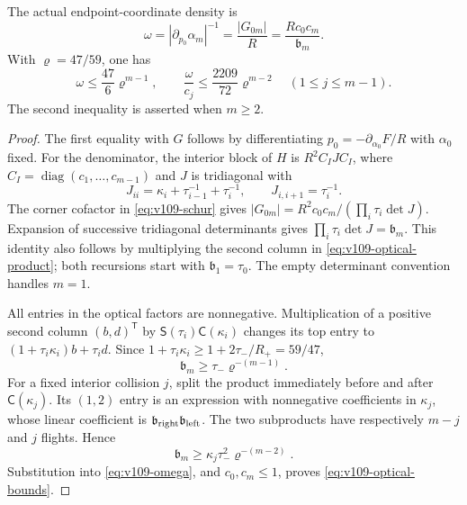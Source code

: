 \begin{lemma}
\label{lem:v109-denominator}
The actual endpoint-coordinate density is
\begin{equation}\label{eq:v109-omega}
 \omega=|\partial_{p_0}\alpha_m|^{-1}
        =\frac{|G_{0m}|}{R}=\frac{Rc_0c_m}{\mathfrak b_m}.
\end{equation}
With $\varrho=47/59$, one has
\begin{equation}\label{eq:v109-optical-bounds}
 \omega\leq\frac{47}{6}\varrho^{m-1},\qquad
 \frac{\omega}{c_j}\leq\frac{2209}{72}\varrho^{m-2}
          \quad(1\leq j\leq m-1).
\end{equation}
The second inequality is asserted when $m\geq2$.
\end{lemma}
\begin{proof}
The first equality with $G$ follows by differentiating
$p_0=-\partial_{\alpha_0}F/R$ with $\alpha_0$ fixed.
For the denominator, the interior block of $H$ is
$R^2 C_I J C_I$, where $C_I=\operatorname{diag}(c_1,\ldots,c_{m-1})$
and $J$ is tridiagonal with
\[
 J_{ii}=\kappa_i+\tau_{i-1}^{-1}+\tau_i^{-1},\qquad
 J_{i,i+1}=\tau_i^{-1}.
\]
The corner cofactor in \eqref{eq:v109-schur} gives
$|G_{0m}|=R^2c_0c_m/(\prod_i\tau_i\det J)$.
Expansion of successive tridiagonal determinants gives
$\prod_i\tau_i\det J=\mathfrak b_m$. This identity also follows
by multiplying the second column in \eqref{eq:v109-optical-product};
both recursions start with $\mathfrak b_1=\tau_0$.
The empty determinant convention handles $m=1$.

All entries in the optical factors are nonnegative. Multiplication
of a positive second column $(b,d)^{\mathsf T}$ by
$\mathsf S(\tau_i)\mathsf C(\kappa_i)$ changes its top entry to
$(1+\tau_i\kappa_i)b+\tau_i d$.
Since $1+\tau_i\kappa_i\geq1+2\tau_-/R_+=59/47$,
\begin{equation}\label{eq:v109-denominator-lower}
 \mathfrak b_m\geq\tau_-\varrho^{-(m-1)}.
\end{equation}
For a fixed interior collision $j$, split the product immediately
before and after $\mathsf C(\kappa_j)$. Its $(1,2)$ entry is an
expression with nonnegative coefficients in $\kappa_j$, whose linear
coefficient is $\mathfrak b_{\rm right}\mathfrak b_{\rm left}$.
The two subproducts have respectively $m-j$ and $j$ flights. Hence
\[
 \mathfrak b_m\geq
   \kappa_j\tau_-^2\varrho^{-(m-2)}.
\]
Substitution into \eqref{eq:v109-omega}, and $c_0,c_m\leq1$, proves
\eqref{eq:v109-optical-bounds}.
\end{proof}

